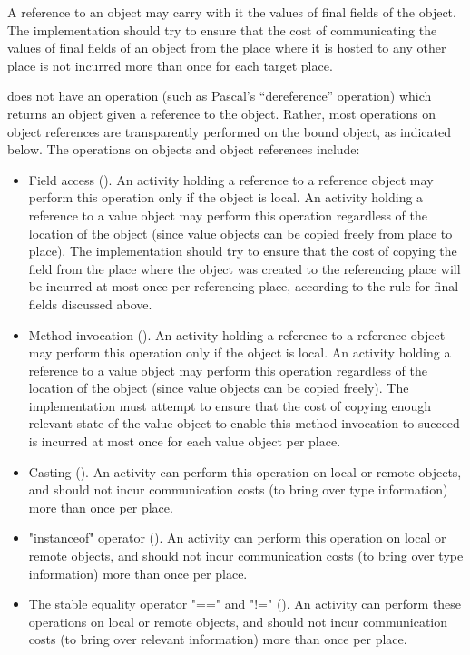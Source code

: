 A reference to an object may carry with it the values of final fields
of the object. The implementation should try to ensure that the cost
of communicating the values of final fields of an object from the
place where it is hosted to any other place is not incurred more than
once for each target place.

{}\Xten{} does not have an operation (such as Pascal's ``dereference''
operation) which returns an object given a reference to the
object. Rather, most operations on object references are transparently
performed on the bound object, as indicated below. The operations on
objects and object references include:
\begin{itemize}

{}\item Field access (). An activity holding a
reference to a reference object may perform this operation only if the
object is local.  An activity holding a reference to a value object
may perform this operation regardless of the location of the object
(since value objects can be copied freely from place to place).  The
implementation should try to ensure that the cost of copying the field
from the place where the object was created to the referencing place
will be incurred at most once per referencing place, according to the
rule for final fields discussed above.

\item Method invocation ().  An activity
holding a reference to a reference object may perform this operation
only if the object is local.  An activity holding a reference to a
value object may perform this operation regardless of the location of
the object (since value objects can be copied freely). The \Xten{}
implementation must attempt to ensure that the cost of copying enough
relevant state of the value object to enable this method invocation to
succeed is incurred at most once for each value object per place.

{}\item Casting ().  An activity can perform this
operation on local or remote objects, and should not incur
communication costs (to bring over type information) more than once
per place.

{}\item \xcd"instanceof" operator ().  An activity
can perform this operation on local or remote objects, and should not
incur communication costs (to bring over type information) more than
once per place.

\item The stable equality operator \xcd"==" and \xcd"!="
(). An activity can perform these operations on
local or remote objects, and should not incur communication costs
(to bring over relevant information) more than once per place.

\end{itemize}

